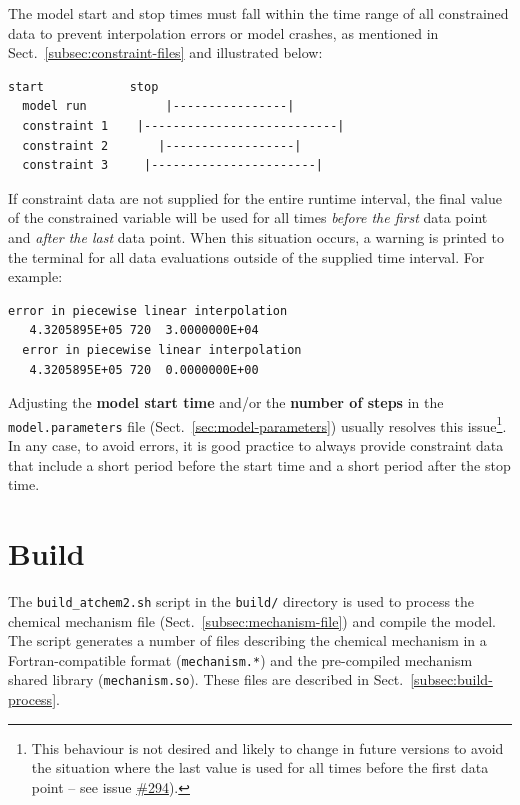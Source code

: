 The model start and stop times must fall within the time range of all
constrained data to prevent interpolation errors or model crashes, as
mentioned in Sect.~\ref{subsec:constraint-files} and illustrated
below:

\begin{Verbatim}[fontsize=\small]
                    start            stop
  model run           |----------------|
  constraint 1    |---------------------------|
  constraint 2       |------------------|
  constraint 3     |-----------------------|
\end{Verbatim}

If constraint data are not supplied for the entire runtime interval, the final value of the
constrained variable will be used for all times \emph{before the first} data point and
\emph{after the last} data point. When this situation occurs, a warning is printed to the
terminal for all data evaluations outside of the supplied time interval. For example:

\begin{Verbatim}[fontsize=\small]
  error in piecewise linear interpolation
   4.3205895E+05 720  3.0000000E+04
  error in piecewise linear interpolation
   4.3205895E+05 720  0.0000000E+00
\end{Verbatim}

Adjusting the \textbf{model start time} and/or the \textbf{number of steps} in the
\texttt{model.parameters} file (Sect.~\ref{sec:model-parameters}) usually resolves this
issue\footnote{This behaviour is not desired and likely to change in future versions to avoid
  the situation where the last value is used for all times before the first data point -- see
  issue \href{https://github.com/AtChem/AtChem2/issues/294}{\#294}).}. In any case, to avoid
errors, it is good practice to always provide constraint data that include a short period
before the start time and a short period after the stop time.

\section{Build} \label{sec:build}

The \texttt{build\_atchem2.sh} script in the \texttt{build/} directory is used to process the
chemical mechanism file (Sect.~\ref{subsec:mechanism-file}) and compile the model. The script
generates a number of files describing the chemical mechanism in a Fortran-compatible format
(\texttt{mechanism.*}) and the pre-compiled mechanism shared library
(\texttt{mechanism.so}). These files are described in Sect.~\ref{subsec:build-process}.

